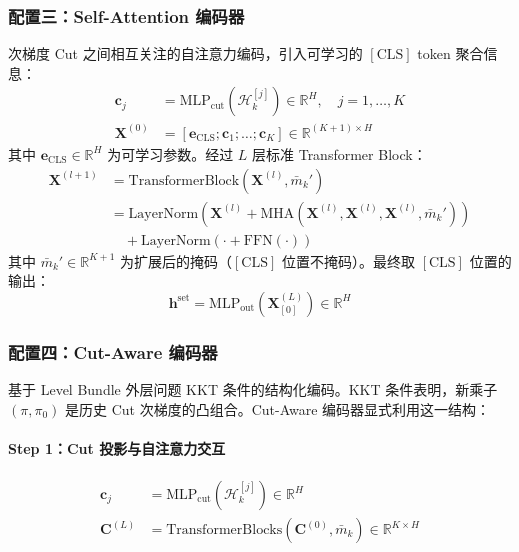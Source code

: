 \documentclass[11pt]{ctexart}
\begin{document}
\subsubsection{配置三：Self-Attention 编码器}

次梯度 Cut 之间相互关注的自注意力编码，引入可学习的 $[\text{CLS}]$ token 聚合信息：
\begin{align}
\mathbf{c}_j &= \mathrm{MLP}_{\text{cut}}\!\left(\mathcal{H}_k^{[j]}\right) \in \mathbb{R}^{H}, \quad j = 1, \ldots, K \\
\mathbf{X}^{(0)} &= \left[\mathbf{e}_{\text{CLS}}; \mathbf{c}_1; \ldots; \mathbf{c}_K\right] \in \mathbb{R}^{(K+1) \times H}
\end{align}
其中 $\mathbf{e}_{\text{CLS}} \in \mathbb{R}^{H}$ 为可学习参数。经过 $L$ 层标准 Transformer Block：
\begin{align}
\mathbf{X}^{(l+1)} &= \mathrm{TransformerBlock}\!\left(\mathbf{X}^{(l)}, \bar{m}_k'\right) \\
&= \mathrm{LayerNorm}\!\left(\mathbf{X}^{(l)} + \mathrm{MHA}\!\left(\mathbf{X}^{(l)}, \mathbf{X}^{(l)}, \mathbf{X}^{(l)}, \bar{m}_k'\right)\right) \\
&\quad + \mathrm{LayerNorm}\!\left(\cdot + \mathrm{FFN}(\cdot)\right)
\end{align}
其中 $\bar{m}_k' \in \mathbb{R}^{K+1}$ 为扩展后的掩码（$[\text{CLS}]$ 位置不掩码）。最终取 $[\text{CLS}]$ 位置的输出：
\begin{equation}
\mathbf{h}^{\text{set}} = \mathrm{MLP}_{\text{out}}\!\left(\mathbf{X}^{(L)}_{[0]}\right) \in \mathbb{R}^{H}
\end{equation}

\subsubsection{配置四：Cut-Aware 编码器}

基于 Level Bundle 外层问题 KKT 条件的结构化编码。KKT 条件表明，新乘子 $(\pi, \pi_0)$ 是历史 Cut 次梯度的凸组合。Cut-Aware 编码器显式利用这一结构：

\paragraph{Step 1：Cut 投影与自注意力交互}
\begin{align}
\mathbf{c}_j &= \mathrm{MLP}_{\text{cut}}\!\left(\mathcal{H}_k^{[j]}\right) \in \mathbb{R}^{H} \\
\mathbf{C}^{(L)} &= \mathrm{TransformerBlocks}\!\left(\mathbf{C}^{(0)}, \bar{m}_k\right) \in \mathbb{R}^{K \times H}
\end{align}
\end{document}

